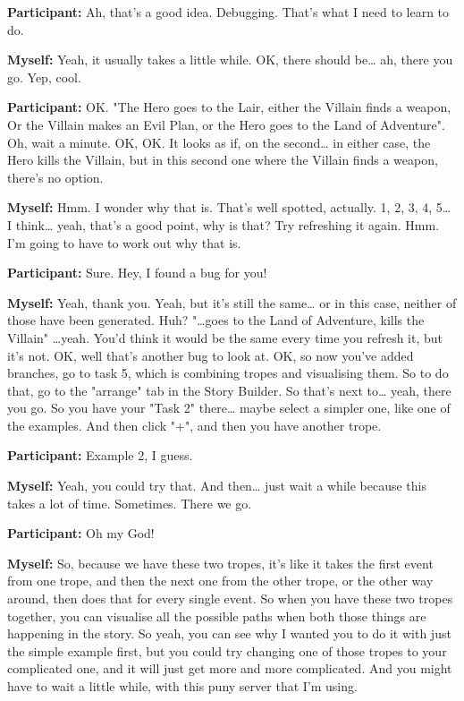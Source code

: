 \documentclass[11pt]{report}
\begin{document}
\begin{linenumbers}
\textbf{Participant:} Ah, that's a good idea. Debugging. That's what I need to learn to do.

\textbf{Myself:} Yeah, it usually takes a little while. OK, there should be\ldots{} ah, there you go. Yep, cool.

\textbf{Participant:} OK. "The Hero goes to the Lair, either the Villain finds a weapon, Or the Villain makes an Evil Plan, or the Hero goes to the Land of Adventure". Oh, wait a minute. OK, OK. It looks as if, on the second\ldots{} in either case, the Hero kills the Villain, but in this second one where the Villain finds a weapon, there's no option.

\textbf{Myself:} Hmm. I wonder why that is. That's well spotted, actually. 1, 2, 3, 4, 5\ldots{} I think\ldots{} yeah, that's a good point, why is that? Try refreshing it again. Hmm. I'm going to have to work out why that is.

\textbf{Participant:} Sure. Hey, I found a bug for you!

\textbf{Myself:} Yeah, thank you. Yeah, but it's still the same\ldots{} or in this case, neither of those have been generated. Huh? "\ldots{}goes to the Land of Adventure, kills the Villain" \ldots{}yeah. You'd think it would be the same every time you refresh it, but it's not. OK, well that's another bug to look at. OK, so now you've added branches, go to task 5, which is combining tropes and visualising them. So to do that, go to the "arrange" tab in the Story Builder. So that's next to\ldots{} yeah, there you go. So you have your "Task 2" there\ldots{} maybe select a simpler one, like one of the examples. And then click "+", and then you have another trope.

\textbf{Participant:} Example 2, I guess.

\textbf{Myself:} Yeah, you could try that. And then\ldots{} just wait a while because this takes a lot of time. Sometimes. There we go.

\textbf{Participant:} Oh my God!

\textbf{Myself:} So, because we have these two tropes, it's like it takes the first event from one trope, and then the next one from the other trope, or the other way around, then does that for every single event. So when you have these two tropes together, you can visualise all the possible paths when both those things are happening in the story. So yeah, you can see why I wanted you to do it with just the simple example first, but you could try changing one of those tropes to your complicated one, and it will just get more and more complicated. And you might have to wait a little while, with this puny server that I'm using.


\end{linenumbers}
\end{document}
